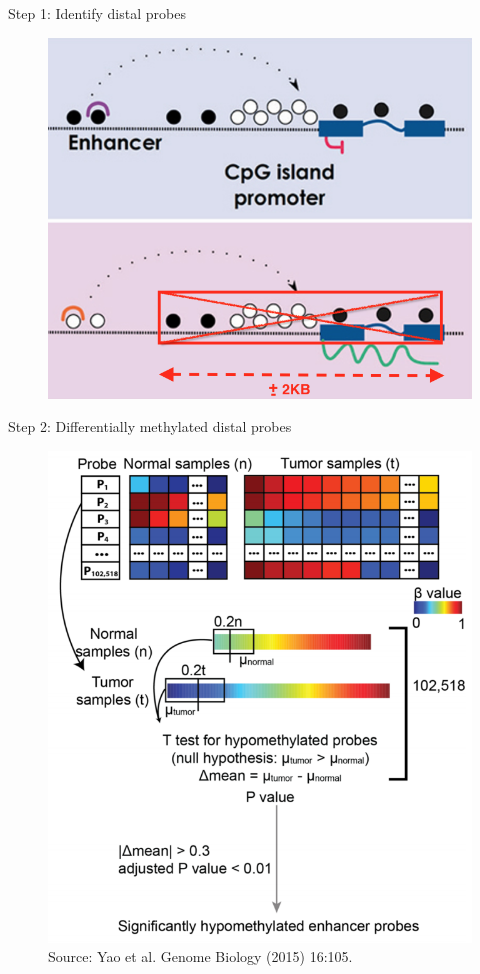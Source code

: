 \documentclass[slidestop,compress,11pt,xcolor=dvipsnames]{beamer}
\begin{document}
\begin{frame}{Step 1: Identify distal probes}
 \begin{figure}
  \centering
  \includegraphics[width=0.7\linewidth]{step1.png}
 \end{figure}
\end{frame}


\begin{frame}{Step 2: Differentially methylated distal probes}
 \vspace*{-0.4cm}
 \begin{figure}
  \centering
  \includegraphics[width=0.6\linewidth]{ELMER/diffmeth.png}{\tiny{\\\vspace*{-0.2cm}Source: Yao et al. Genome Biology (2015) 16:105.}}
 \end{figure}
\end{frame}
\end{document}
